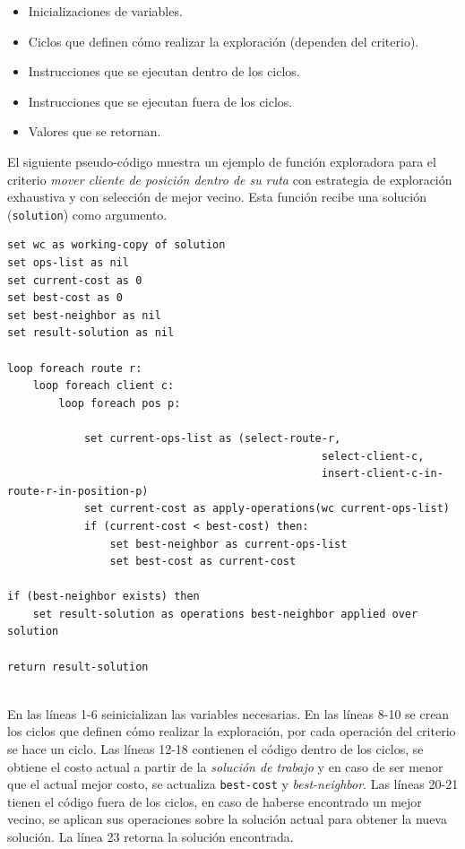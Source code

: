 \begin{itemize}
	\item Inicializaciones de variables.
	\item Ciclos que definen cómo realizar la exploración (dependen del criterio).
	\item Instrucciones que se ejecutan dentro de los ciclos.
	\item Instrucciones que se ejecutan fuera de los ciclos.
	\item Valores que se retornan.
\end{itemize}

El siguiente pseudo-código muestra un ejemplo de función exploradora para el criterio \textit{mover cliente de posición dentro de su ruta} con estrategia de exploración exhaustiva y con selección de mejor vecino. Esta función recibe una solución (\texttt{solution}) como argumento.

\begin{lstlisting}
set wc as working-copy of solution
set ops-list as nil
set current-cost as 0
set best-cost as 0
set best-neighbor as nil
set result-solution as nil

loop foreach route r:
	loop foreach client c:
		loop foreach pos p:
			
			set current-ops-list as (select-route-r,
												 select-client-c,
												 insert-client-c-in-route-r-in-position-p)
			set current-cost as apply-operations(wc current-ops-list)
			if (current-cost < best-cost) then:
				set best-neighbor as current-ops-list
				set best-cost as current-cost
				
if (best-neighbor exists) then
	set result-solution as operations best-neighbor applied over solution
	
return result-solution


\end{lstlisting}

En las líneas 1-6 seinicializan las variables necesarias. En las líneas 8-10 se crean los ciclos que definen cómo realizar la exploración, por cada operación del criterio se hace un ciclo. Las líneas 12-18 contienen el código dentro de los ciclos, se obtiene el costo actual a partir de la \textit{solución de trabajo} y en caso de ser menor que el actual mejor costo, se actualiza \texttt{best-cost} y \textit{best-neighbor}. Las líneas 20-21 tienen el código fuera de los ciclos, en caso de haberse encontrado un mejor vecino, se aplican sus operaciones sobre la solución actual para obtener la nueva solución. La línea 23 retorna la solución encontrada.

